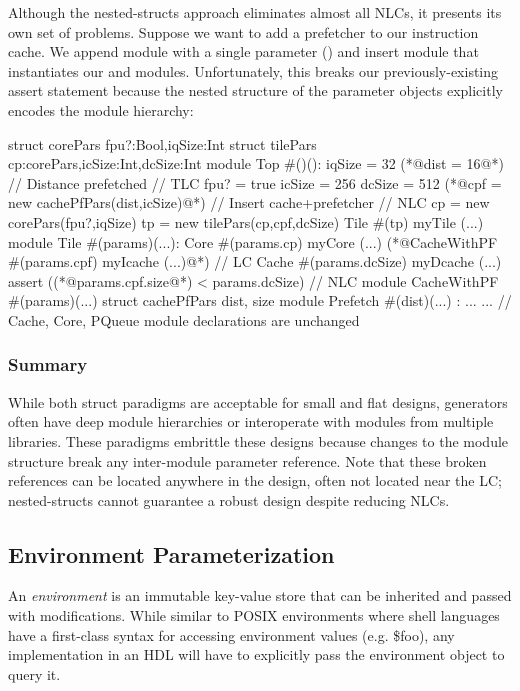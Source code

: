 Although the nested-structs approach eliminates almost all NLCs, it presents its own set of problems. 
Suppose we want to add a prefetcher to our instruction cache. 
We append module  with a single parameter () and insert module  that instantiates our  and  modules. 
Unfortunately, this breaks our previously-existing assert statement because the nested structure of the parameter objects explicitly encodes the module hierarchy:

\begin{phdl}
struct corePars {fpu?:Bool,iqSize:Int}
struct tilePars {cp:corePars,icSize:Int,dcSize:Int}
module Top #()():
  iqSize = 32
  (*@\textcolor[rgb]{1,0,0}{dist = 16}@*)    // Distance prefetched                            // TLC
  fpu? = true
  icSize = 256
  dcSize = 512
  (*@\textcolor[rgb]{1,0,0}{cpf = new cachePfPars(dist,icSize)}@*) // Insert cache+prefetcher  // NLC
  cp = new corePars(fpu?,iqSize)
  tp = new tilePars(cp,cpf,dcSize)
  Tile #(tp) myTile (...)
module Tile #(params)(...):
  Core  #(params.cp)  myCore   (...)
  (*@\textcolor[rgb]{1,0,0}{CacheWithPF \#(params.cpf) myIcache (...)}@*)                       // LC
  Cache #(params.dcSize) myDcache (...)
  assert ((*@\textcolor[rgb]{1,0,0}{params.cpf.size}@*) < params.dcSize)                       // NLC
module CacheWithPF #(params)(...)
struct cachePfPars {dist, size}
module Prefetch #(dist)(...) : ...
... // Cache, Core, PQueue module declarations are unchanged
\end{phdl} 

\subsubsection{Summary}

While both struct paradigms are acceptable for small and flat designs, generators often have deep module hierarchies or interoperate with modules from multiple libraries. 
These paradigms embrittle these designs because changes to the module structure break any inter-module parameter reference. 
Note that these broken references can be located anywhere in the design, often not located near the LC; nested-structs cannot guarantee a robust design despite reducing NLCs.

\subsection{Environment Parameterization}
An \emph{environment} is an immutable key-value store that can be inherited and passed with modifications. While similar to POSIX environments where shell languages have a first-class syntax for accessing environment values (e.g. \$foo), any implementation in an HDL will have to explicitly pass the environment object to query it.

